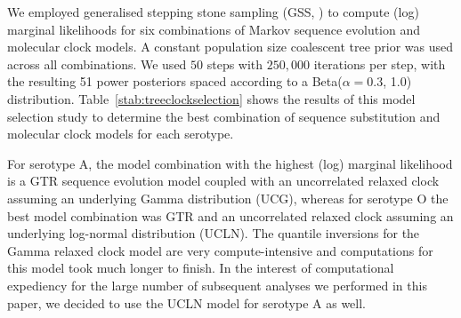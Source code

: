 \documentclass[a4paper,10pt]{article}
\begin{document}
We employed generalised stepping stone sampling (GSS, \citet{M-Baele2015}) to compute (log) marginal likelihoods for six combinations of Markov sequence evolution and molecular clock models. %
A constant population size coalescent tree prior was used across all combinations. %
We used $50$ steps with $250,000$ iterations per step, with the resulting 51 power posteriors spaced according to a Beta($\alpha = 0.3$, 1.0) distribution. %
Table~\ref{stab:treeclockselection} shows the results of this model selection study to determine the best combination of sequence substitution and molecular clock models for each serotype.

For serotype A, the model combination with the highest (log) marginal likelihood is a GTR sequence evolution model coupled with an uncorrelated relaxed clock assuming an underlying Gamma distribution (UCG), whereas for serotype O the best model combination was GTR and an uncorrelated relaxed clock assuming an underlying log-normal distribution (UCLN).
The quantile inversions for the Gamma relaxed clock model are very compute-intensive and computations for this model took much longer to finish.
In the interest of computational expediency for the large number of subsequent analyses we performed in this paper, we decided to use the UCLN model for serotype A as well.
\end{document}
